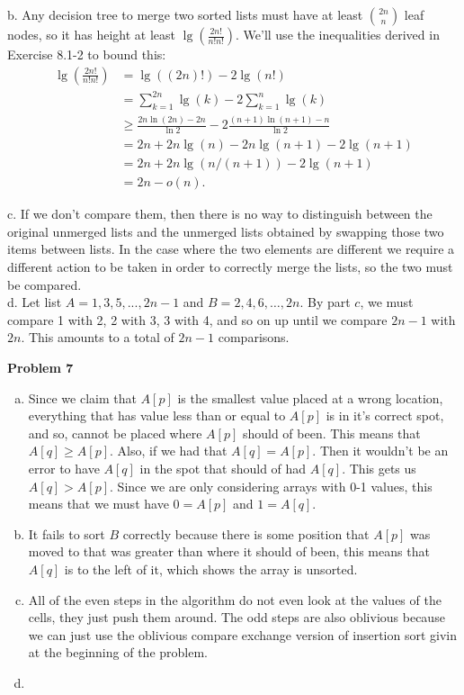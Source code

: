 \documentclass{article}
\begin{document}
b. Any decision tree to merge two sorted lists must have at least ${2n \choose n}$ leaf nodes, so it has height at least $\lg\left(\frac{2n!}{n!n!}\right)$.  We'll use the inequalities derived in Exercise 8.1-2 to bound this:
\begin{align*}
\lg\left(\frac{2n!}{n!n!}\right) &= \lg((2n)!) - 2\lg(n!) \\
&= \sum_{k=1}^{2n} \lg(k) - 2\sum_{k=1}^n \lg(k) \\
& \geq \frac{2n \ln(2n) - 2n}{\ln 2} - 2\frac{(n+1)\ln(n+1) - n}{\ln 2} \\
&= 2n + 2n\lg(n) - 2n\lg(n+1) - 2\lg(n+1) \\
&= 2n + 2n\lg(n/(n+1)) - 2\lg(n+1) \\
&= 2n - o(n).
\end{align*}

c. If we don't compare them, then there is no way to distinguish between the original unmerged lists and the unmerged lists obtained by swapping those two items between lists.  In the case where the two elements are different we require a different action to be taken in order to correctly merge the lists, so the two must be compared.\\

d. Let list $A = 1, 3, 5, ..., 2n-1$ and $B = 2, 4, 6, \ldots, 2n$. By part $c$, we must compare 1 with 2, 2 with 3, 3 with 4, and so on up until we compare $2n-1$ with $2n$. This amounts to a total of $2n-1$ comparisons. 

\noindent\textbf{Problem 7}
\begin{enumerate}[a.]
\item
Since we claim that $A[p]$ is the smallest value placed at a wrong location, everything that has value less than or equal to $A[p]$ is in it's correct spot, and so, cannot be placed where $A[p]$ should of been. This means that $A[q] \ge A[p]$. Also, if we had that $A[q]=A[p]$. Then it wouldn't be an error to have $A[q]$ in the spot that should of had $A[q]$. This gets us $A[q] > A[p]$. Since we are only considering arrays with 0-1 values, this means that we must have $0=A[p]$ and $1=A[q]$.

\item

It fails to sort $B$ correctly because there is some position that $A[p]$ was moved to that was greater than where it should of been, this means that $A[q]$ is to the left of it, which shows the array is unsorted.

\item

All of the even steps in the algorithm do not even look at the values of the cells, they just push them around. The odd steps are also oblivious because we can just use the oblivious compare exchange version of insertion sort givin at the beginning of the problem.

\item


\end{enumerate}
\end{document}
